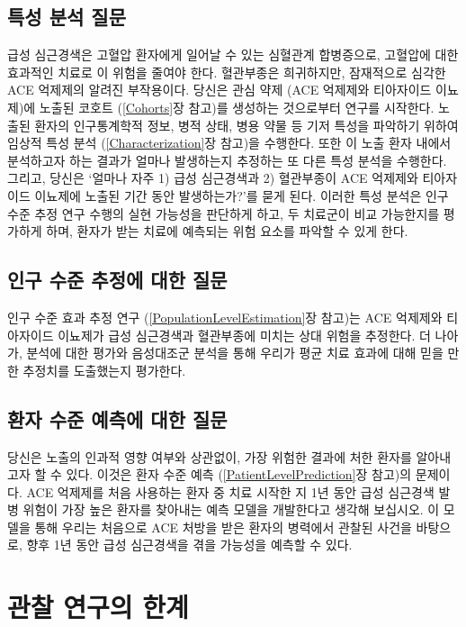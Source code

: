 \documentclass[10.5pt]{book}
\theoremstyle{definition}
\theoremstyle{definition}
\theoremstyle{definition}
\theoremstyle{remark}
\begin{document}
\subsection{특성 분석 질문}\label{--}

급성 심근경색은 고혈압 환자에게 일어날 수 있는 심혈관계 합병증으로,
고혈압에 대한 효과적인 치료로 이 위험을 줄여야 한다. 혈관부종은
희귀하지만, 잠재적으로 심각한 ACE 억제제의 알려진 부작용이다. 당신은
관심 약제 (ACE 억제제와 티아자이드 이뇨제)에 노출된 코호트
(\ref{Cohorts}장 참고)를 생성하는 것으로부터 연구를 시작한다. 노출된
환자의 인구통계학적 정보, 병적 상태, 병용 약물 등 기저 특성을 파악하기
위하여 임상적 특성 분석 (\ref{Characterization}장 참고)을 수행한다. 또한
이 노출 환자 내에서 분석하고자 하는 결과가 얼마나 발생하는지 추정하는 또
다른 특성 분석을 수행한다. 그리고, 당신은 `얼마나 자주 1) 급성
심근경색과 2) 혈관부종이 ACE 억제제와 티아자이드 이뇨제에 노출된 기간
동안 발생하는가?'를 묻게 된다. 이러한 특성 분석은 인구 수준 추정 연구
수행의 실현 가능성을 판단하게 하고, 두 치료군이 비교 가능한지를 평가하게
하며, 환자가 받는 치료에 예측되는 위험 요소를 파악할 수 있게 한다.

\subsection{인구 수준 추정에 대한 질문}\label{----}

인구 수준 효과 추정 연구 (\ref{PopulationLevelEstimation}장 참고)는 ACE
억제제와 티아자이드 이뇨제가 급성 심근경색과 혈관부종에 미치는 상대
위험을 추정한다. 더 나아가, 분석에 대한 평가와 음성대조군 분석을 통해
우리가 평균 치료 효과에 대해 믿을 만한 추정치를 도출했는지 평가한다.

\subsection{환자 수준 예측에 대한 질문}\label{----}

당신은 노출의 인과적 영향 여부와 상관없이, 가장 위험한 결과에 처한
환자를 알아내고자 할 수 있다. 이것은 환자 수준 예측
(\ref{PatientLevelPrediction}장 참고)의 문제이다. ACE 억제제를 처음
사용하는 환자 중 치료 시작한 지 1년 동안 급성 심근경색 발병 위험이 가장
높은 환자를 찾아내는 예측 모델을 개발한다고 생각해 보십시오. 이 모델을
통해 우리는 처음으로 ACE 처방을 받은 환자의 병력에서 관찰된 사건을
바탕으로, 향후 1년 동안 급성 심근경색을 겪을 가능성을 예측할 수 있다.

\section{관찰 연구의 한계}\label{--}
\end{document}
